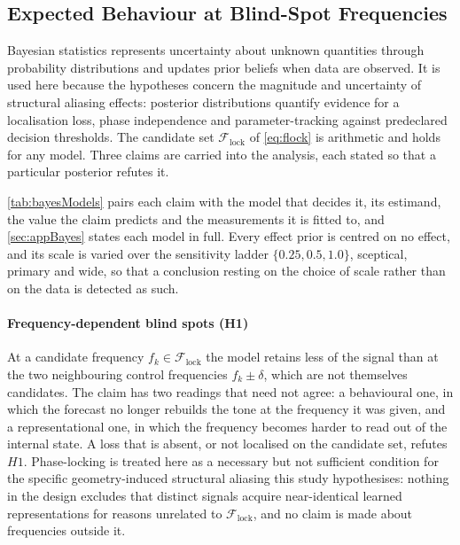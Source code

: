 \subsection{Expected Behaviour at Blind-Spot Frequencies}\label{sec:three}
\begingroup
\let\subsubsection\paragraph
\let\subsection\subsubsection
Bayesian statistics represents uncertainty about unknown quantities through probability distributions and updates prior beliefs when data are observed\autocite{murphyProbabilisticMachineLearning2023}. It is used here because the hypotheses concern the magnitude and uncertainty of structural aliasing effects: posterior distributions quantify evidence for a localisation loss, phase independence and parameter-tracking against predeclared decision thresholds. The candidate set $\mathcal F_{\mathrm{lock}}$ of \autoref{eq:flock} is arithmetic and holds for any model. Three claims are carried into the analysis, each stated so that a particular posterior refutes it.

\autoref{tab:bayesModels} pairs each claim with the model that decides it, its estimand, the value the claim predicts and the measurements it is fitted to, and \autoref{sec:appBayes} states each model in full. Every effect prior is centred on no effect, and its scale is varied over the sensitivity ladder $\{0.25,0.5,1.0\}$, sceptical, primary and wide, so that a conclusion resting on the choice of scale rather than on the data is detected as such.

\subsubsection*{Frequency-dependent blind spots (H1)}
At a candidate frequency $f_k\in\mathcal F_{\mathrm{lock}}$ the model retains less of the signal than at the two neighbouring control frequencies $f_k\pm\delta$, which are not themselves candidates. The claim has two readings that need not agree: a behavioural one, in which the forecast no longer rebuilds the tone at the frequency it was given, and a representational one, in which the frequency becomes harder to read out of the internal state. A loss that is absent, or not localised on the candidate set, refutes $H1$. Phase-locking is treated here as a necessary but not sufficient condition for the specific geometry-induced structural aliasing this study hypothesises: nothing in the design excludes that distinct signals acquire near-identical learned representations for reasons unrelated to $\mathcal F_{\mathrm{lock}}$, and no claim is made about frequencies outside it.

